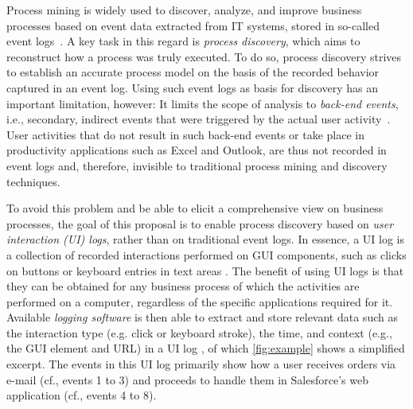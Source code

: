 \label{sec:startingpoint}

\vspace{-1em}

Process mining is widely used to discover, analyze, and improve business processes 
based on event data extracted from IT systems, stored in so-called event logs~\cite{van2016data}.
A key task in this regard is \emph{process discovery}, which aims to reconstruct how a process was truly executed. To do so, process discovery strives to establish an accurate process model on the basis of the recorded behavior captured in an event log.
Using such event logs as basis for discovery has an important limitation, however: It limits the scope of analysis to \textit{back-end events}, i.e., secondary, indirect events that were triggered by the actual user activity~\cite{diba2020extraction}. User activities that do not result in such back-end events or take place in productivity applications such as Excel and Outlook, are thus not recorded in event logs and, therefore, invisible to traditional process mining and discovery techniques. 

To avoid this problem and be able to elicit a comprehensive view on business processes, the goal of this proposal is to enable process discovery based on \textit{user interaction (UI) logs}, rather than on traditional event logs. In essence, a UI log is a collection of recorded interactions performed on GUI components, such as clicks on buttons or keyboard entries in text areas \cite{Urabe21}. The benefit of using UI logs is that they 
can be obtained for any business process of which the activities are performed on a computer, regardless of the specific applications required for it.
Available \textit{logging software} is then able to extract and store relevant data such as the interaction type (e.g. click or keyboard stroke), the time, and context (e.g., the GUI element and URL) in a UI log  \cite{leno2019action}, of which 
\autoref{fig:example} shows a simplified excerpt.
The events in this UI log primarily show how a user receives orders via e-mail (cf., events 1 to 3) and proceeds to handle them in Salesforce's web application (cf., events 4 to 8).



